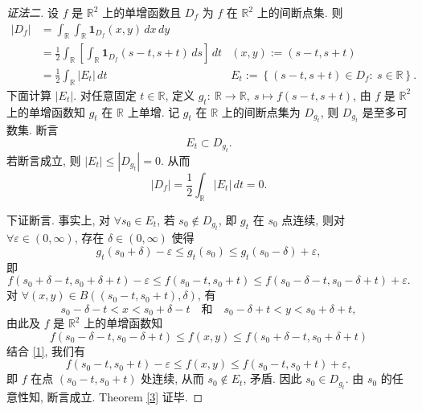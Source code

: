 \documentclass[a4paper,11pt]{article}
\theoremstyle{definition}
\begin{document}
\begin{proof}[证法二]
    设 $ f $ 是 $ \mathbb{R}^2 $ 上的单增函数且 $ D_f $ 为 $ f $ 在 $ \mathbb{R}^2 $ 上的间断点集.
    则
    \begin{align*}
        |D_f| &= \int_\mathbb{R} \int_\mathbb{R} \mathbf{1}_{D_f}(x, y) \, dx \, dy \\
              &= \frac{1}{2} \int_\mathbb{R} \left[ \int_\mathbb{R} \mathbf{1}_{D_f}(s - t, s + t) \, ds \right] \, dt
                & (x, y) := (s - t, s + t) \\
              &= \frac{1}{2} \int_\mathbb{R} |E_t| \, dt
                & E_t := \left\{ (s - t, s + t) \in D_f :\ s \in \mathbb{R} \right\}.
    \end{align*}
    下面计算 $ |E_t| $. 
    对任意固定 $ t \in \mathbb{R} $, 定义 $ g_t :\ \mathbb{R} \to \mathbb{R},\ s \mapsto f(s - t, s + t) $,
    由 $ f $ 是 $ \mathbb{R}^2 $ 上的单增函数知 $ g_t $ 在 $ \mathbb{R} $ 上单增.
    记 $ g_t $ 在 $ \mathbb{R} $ 上的间断点集为 $ D_{g_t} $, 则 $ D_{g_t} $ 是至多可数集. 断言 
    $$ 
        E_t \subset D_{g_t}.
    $$
    若断言成立, 则 $ |E_t| \leq |D_{g_t}| = 0 $. 从而
    $$
        |D_f| = \frac{1}{2} \int_\mathbb{R} |E_t| \, dt = 0.
    $$
    
    下证断言. 事实上, 对 $ \forall s_0 \in E_t $, 若 $ s_0 \notin D_{g_t} $,
    即 $ g_t $ 在 $ s_0 $ 点连续, 则对 $ \forall \varepsilon \in (0, \infty) $, 存在 $ \delta \in (0, \infty) $
    使得
    $$  
        g_t(s_0 + \delta) - \varepsilon \leq g_t(s_0) \leq g_t(s_0 - \delta) + \varepsilon,
    $$
    即
    \begin{equation}  \label{1}
        f(s_0 + \delta - t, s_0 + \delta + t) - \varepsilon
            \leq f(s_0 - t, s_0 + t) \leq f(s_0 - \delta - t, s_0 - \delta + t) + \varepsilon.
    \end{equation} 
    对 $ \forall (x, y) \in B((s_0 - t, s_0 + t), \delta) $, 有
    $$ 
        s_0 - \delta - t < x < s_0 + \delta - t
        \quad\text{和}\quad
        s_0 - \delta + t < y < s_0 + \delta + t,
    $$
    由此及 $ f $ 是 $ \mathbb{R}^2 $ 上的单增函数知
    $$
        f(s_0 - \delta - t, s_0 - \delta + t) \leq f(x, y) \leq f(s_0 + \delta - t, s_0 + \delta + t)
    $$
    结合 \eqref{1}, 我们有
    $$
        f(s_0 - t, s_0 + t) - \varepsilon \leq f(x, y) \leq f(s_0 - t, s_0 + t) + \varepsilon,
    $$
    即 $ f $ 在点 $ (s_0 - t, s_0 + t) $ 处连续, 从而 $ s_0 \notin E_t $, 矛盾. 因此 $ s_0 \in D_{g_t} $.
    由 $ s_0 $ 的任意性知, 断言成立. 
    Theorem \ref{3} 证毕.
\end{proof}
\end{document}
